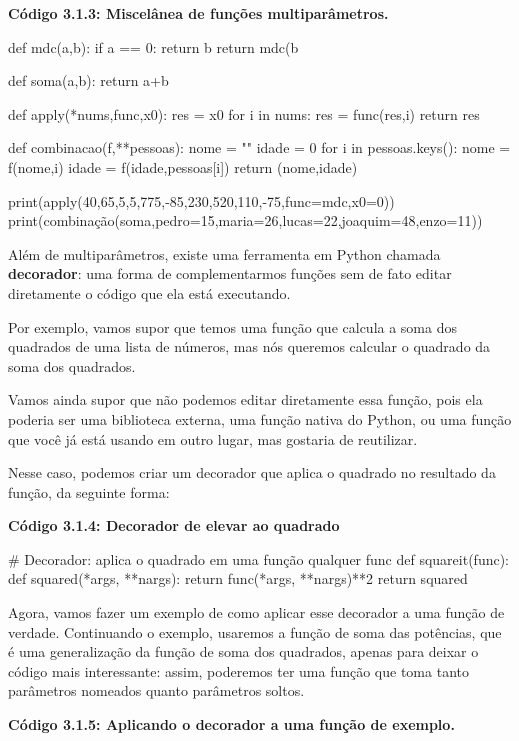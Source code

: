 \documentclass[11pt, a4paper]{article}
\begin{document}
\label{c3.1.3}
\textbf{Código 3.1.3: Miscelânea de funções multiparâmetros.}

\begin{code}
def mdc(a,b):
    if a == 0:
        return b
    return mdc(b%

def soma(a,b):
    return a+b

def apply(*nums,func,x0):
    res = x0
    for i in nums:
        res = func(res,i)
    return res

def combinacao(f,**pessoas):
    nome = ""
    idade = 0
    for i in pessoas.keys():
        nome = f(nome,i)
        idade = f(idade,pessoas[i])
    return (nome,idade)

print(apply(40,65,5,5,775,-85,230,520,110,-75,func=mdc,x0=0))
print(combinação(soma,pedro=15,maria=26,lucas=22,joaquim=48,enzo=11))
\end{code}

Além de multiparâmetros, existe uma ferramenta em Python chamada \textbf{decorador}: uma forma de complementarmos funções sem de fato editar diretamente o código que ela está executando.

Por exemplo, vamos supor que temos uma função que calcula a soma dos quadrados de uma lista de números, mas nós queremos calcular o quadrado da soma dos quadrados.

Vamos ainda supor que não podemos editar diretamente essa função, pois ela poderia ser uma biblioteca externa, uma função nativa do Python, ou uma função que você já está usando em outro lugar, mas gostaria de reutilizar.

Nesse caso, podemos criar um decorador que aplica o quadrado no resultado da função, da seguinte forma:

\textbf{Código 3.1.4: Decorador de elevar ao quadrado}

\begin{code}
# Decorador: aplica o quadrado em uma função qualquer func
def squareit(func):
    def squared(*args, **nargs):
        return func(*args, **nargs)**2
    return squared
\end{code}

Agora, vamos fazer um exemplo de como aplicar esse decorador a uma função de verdade. Continuando o exemplo, usaremos a função de soma das potências, que é uma generalização da função de soma dos quadrados, apenas para deixar o código mais interessante: assim, poderemos ter uma função que toma tanto parâmetros nomeados quanto parâmetros soltos.

\textbf{Código 3.1.5: Aplicando o decorador a uma função de exemplo.}
\end{document}
